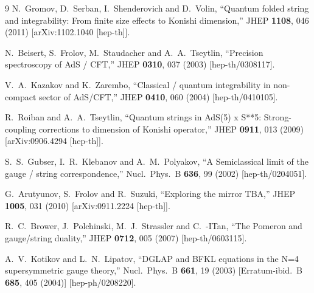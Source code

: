 \documentclass[a4paper,11pt]{article}
\numberwithin{equation}{section}
\begin{document}
\begin{thebibliography} {9}
  N.~Gromov, D.~Serban, I.~Shenderovich and D.~Volin,
  ``Quantum folded string and integrability: From finite size effects to Konishi dimension,''
  JHEP {\bf 1108}, 046 (2011)
  [arXiv:1102.1040 [hep-th]].

  N.~Beisert, S.~Frolov, M.~Staudacher and A.~A.~Tseytlin,
  ``Precision spectroscopy of AdS / CFT,''
  JHEP {\bf 0310}, 037 (2003)
  [hep-th/0308117].

  V.~A.~Kazakov and K.~Zarembo,
  ``Classical / quantum integrability in non-compact sector of AdS/CFT,''
  JHEP {\bf 0410}, 060 (2004)
  [hep-th/0410105].

  R.~Roiban and A.~A.~Tseytlin,
  ``Quantum strings in AdS(5) x S**5: Strong-coupling corrections to dimension of Konishi operator,''
  JHEP {\bf 0911}, 013 (2009)
  [arXiv:0906.4294 [hep-th]].

  S.~S.~Gubser, I.~R.~Klebanov and A.~M.~Polyakov,
  ``A Semiclassical limit of the gauge / string correspondence,''
  Nucl.\ Phys.\ B {\bf 636}, 99 (2002)
  [hep-th/0204051].

  G.~Arutyunov, S.~Frolov and R.~Suzuki,
  ``Exploring the mirror TBA,''
  JHEP {\bf 1005}, 031 (2010)
  [arXiv:0911.2224 [hep-th]].

  R.~C.~Brower, J.~Polchinski, M.~J.~Strassler and C.~-ITan,
  ``The Pomeron and gauge/string duality,''
  JHEP {\bf 0712}, 005 (2007)
  [hep-th/0603115].

  A.~V.~Kotikov and L.~N.~Lipatov,
  ``DGLAP and BFKL equations in the N=4 supersymmetric gauge theory,''
  Nucl.\ Phys.\ B {\bf 661}, 19 (2003)
  [Erratum-ibid.\ B {\bf 685}, 405 (2004)]
  [hep-ph/0208220].


\end{thebibliography}
\end{document}

